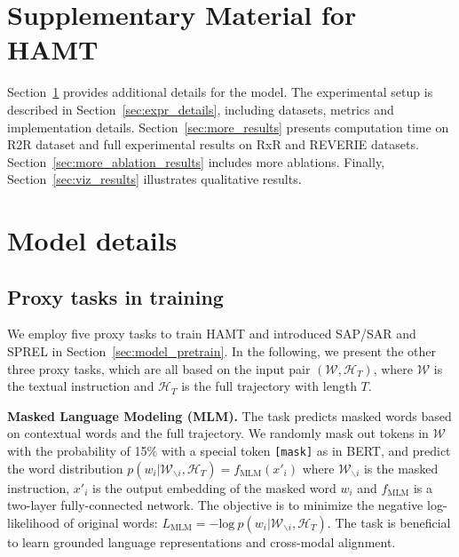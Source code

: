 \appendix

\section*{Supplementary Material for HAMT}

Section~\ref{sec:model_details} provides additional details for the model. The experimental setup is described in Section~\ref{sec:expr_details}, including datasets, metrics and implementation details.
Section~\ref{sec:more_results} presents computation time on R2R dataset and full experimental results on RxR and REVERIE datasets. Section~\ref{sec:more_ablation_results} includes more ablations. 
Finally, Section~\ref{sec:viz_results} illustrates qualitative results.

\section{Model details}
\label{sec:model_details}
\subsection{Proxy tasks in training}
We employ five proxy tasks to train HAMT and introduced SAP/SAR and SPREL in Section~\ref{sec:model_pretrain}. In the following, we present the other three proxy tasks, which are all based on the input pair $(\mathcal{W}, \mathcal{H}_T)$, where $\mathcal{W}$ is the textual instruction and $\mathcal{H}_T$ is the full trajectory with length $T$.

\noindent\textbf{Masked Language Modeling (MLM).}
The task predicts masked words based on contextual words and the full trajectory.
We randomly mask out tokens in $\mathcal{W}$ with the probability of 15\% with a special token \verb|[mask]| as in BERT, and predict the word distribution $p (w_i|\mathcal{W}_{\backslash i}, \mathcal{H}_T)=f_{\text{MLM}}(x'_i)$ where $\mathcal{W}_{\backslash i}$ is the masked instruction, $x'_i$ is the output embedding of the masked word $w_i$ and $f_{\text{MLM}}$ is a two-layer fully-connected network.
The objective is to minimize the negative log-likelihood of original words: $L_{\text{MLM}} = - \mathrm{log}\ p (w_i|\mathcal{W}_{\backslash i}, \mathcal{H}_T)$.
The task is beneficial to learn grounded language representations and cross-modal alignment.

